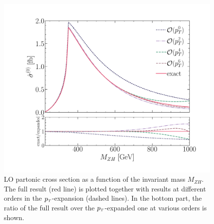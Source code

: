 \begin{figure}[t]
	\centering
	\includegraphics[width=\linewidth]{./figures/LO_ptexp_ratio_1000.pdf}
	\caption{LO partonic cross section
		as a function of the invariant mass $M_{ZH}$.
		The full result (red line) is plotted together with results at
		different orders in the $p_{\scriptscriptstyle T}$-expansion (dashed lines). In the bottom part,
		the ratio of the full result over the $p_{\scriptscriptstyle T}$-expanded one at
		various orders is shown.}
	\label{fig:LO}
\end{figure}

